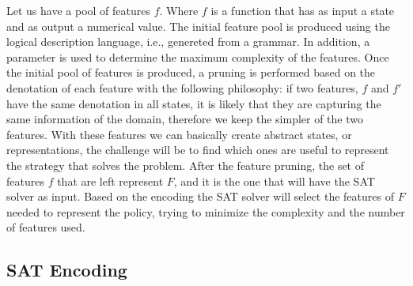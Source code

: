 \documentclass[a4paper]{article}
\begin{document}
Let us have a pool of features $f$. Where $f$ is a function that has as input a state and as output a numerical value. The initial feature pool is produced using the logical description language, i.e., genereted from a grammar. In addition, a parameter is used to determine the maximum complexity of the features. Once the initial pool of features is produced, a pruning is performed based on the denotation of each feature with the following philosophy: if two features, $f$ and $f'$ have the same denotation in all states, it is likely that they are capturing the same information of the domain, therefore we keep the simpler of the two features. With these features we can basically create abstract states, or representations, the challenge will be to find which ones are useful to represent the strategy that solves the problem. After the feature pruning, the set of features $f$ that are left represent $F$, and it is the one that will have the SAT solver as input. Based on the encoding the SAT solver will select the features of $F$ needed to represent the policy, trying to minimize the complexity and the number of features used.


\subsection{SAT Encoding}
\end{document}
